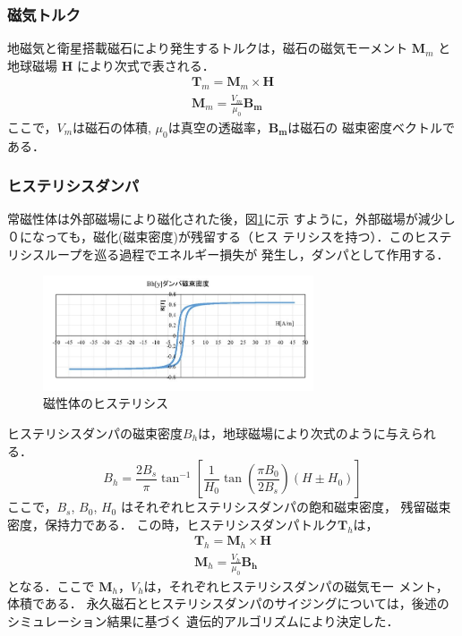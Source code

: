 \subsubsection{磁気トルク}
地磁気と衛星搭載磁石により発生するトルクは，磁石の磁気モーメント
$\bm{M}_m$ と 地球磁場 $\bm{H}$ により次式で表される．
\begin{eqnarray}
  \bm{T}_{m} = \bm{M}_{m} \times \bm{H} \\
  \bm{M}_m = \frac{V_m}{\mu_0} \bm{B_m}
\end{eqnarray}
ここで，$V_m$は磁石の体積, $\mu_0$は真空の透磁率，$\bm{B_m}$は磁石の
磁束密度ベクトルである．

\subsubsection{ヒステリシスダンパ}
常磁性体は外部磁場により磁化された後，図\ref{3_5_hysteresis_loop}に示
すように，外部磁場が減少し０になっても，磁化(磁束密度)が残留する（ヒス
  テリシスを持つ）．このヒステリシスループを巡る過程でエネルギー損失が
発生し，ダンパとして作用する．

\begin{figure}[htbp]
	\centering
	\includegraphics[width=8cm]{./03/fig/3_5_hysteresis_loop.jpg}
	\caption{磁性体のヒステリシス}
	\label{3_5_hysteresis_loop}
\end{figure}

ヒステリシスダンパの磁束密度$B_h$は，地球磁場により次式のように与えられる．
\begin{equation}
B_h = \frac{2B_s}{\pi}\tan^{-1}\left[\frac{1}{H_0}\tan\left(\frac{\pi
    B_0}{2B_s}\right)(H \pm H_0) \right]
\end{equation}
ここで，$B_s$, $B_0$, $H_0$ はそれぞれヒステリシスダンパの飽和磁束密度，
残留磁束密度，保持力である．
この時，ヒステリシスダンパトルク$\bm{T}_h$は，
\begin{eqnarray}
  \bm{T}_{h} = \bm{M}_{h} \times \bm{H} \\
  \bm{M}_h = \frac{V_h}{\mu_0} \bm{B_h}
\end{eqnarray}
となる．ここで $\bm{M}_h$，$V_h$は，それぞれヒステリシスダンパの磁気モー
メント，体積である．
永久磁石とヒステリシスダンパのサイジングについては，後述のシミュレーション結果に基づく
遺伝的アルゴリズムにより決定した．

